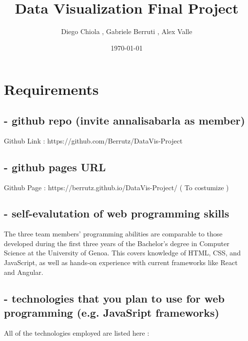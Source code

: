 \documentclass{article}
\title{Data Visualization Final Project}
\author{Diego Chiola , Gabriele Berruti , Alex Valle}
\date{\today}                %
\begin{document}
\maketitle                   %

\section{Requirements}

\subsection{- github repo (invite annalisabarla as member)}
Github Link : https://github.com/Berrutz/DataVis-Project

\subsection{- github pages URL}
Github Page : https://berrutz.github.io/DataVis-Project/   ( To costumize )

\subsection{- self-evalutation of web programming skills}
The three team members' programming abilities are comparable to those developed during the first three years of the Bachelor's degree in 
Computer Science at the University of Genoa. 
This covers knowledge of HTML, CSS, and JavaScript, as well as hands-on experience with current frameworks like React and Angular.

\subsection{- technologies that you plan to use for web programming (e.g. JavaSript frameworks)}
All of the technologies employed are listed here :
\end{document}

